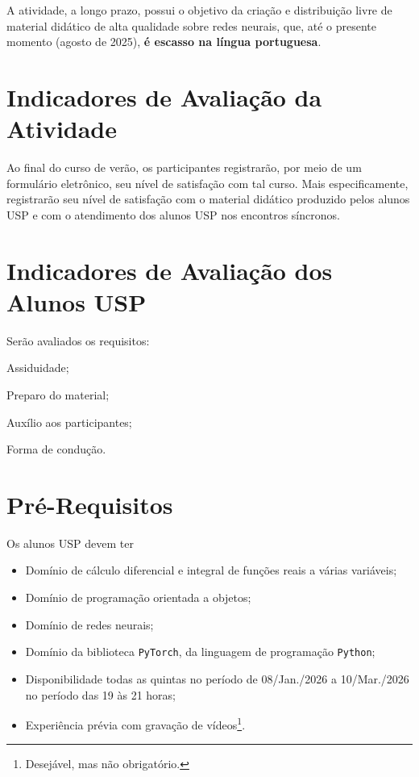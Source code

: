 \documentclass[a4paper,12pt, brazil]{article}
\begin{document}
    A atividade, a longo prazo, possui o objetivo da criação e distribuição livre de material didático de alta qualidade sobre redes neurais, que, até o presente momento (agosto de 2025), \textbf{é escasso na língua portuguesa}.

    \section*{Indicadores de Avaliação da Atividade}
    Ao final do curso de verão, os participantes registrarão, por meio de um formulário eletrônico, seu nível de satisfação com tal curso. Mais especificamente, registrarão seu nível de satisfação com o material didático produzido pelos alunos USP e com o atendimento dos alunos USP nos encontros síncronos.

    \section*{Indicadores de Avaliação dos Alunos USP}
    Serão avaliados os requisitos:
    \begin{itemize}
\begin{multicols}{2}
        \item Assiduidade;
        \item Preparo do material;
        \item Auxílio aos participantes;
        \item Forma de condução.
\end{multicols}
    \end{itemize}

    \section*{Pré-Requisitos}
    Os alunos USP devem ter
    \begin{itemize}
        \item  Domínio de cálculo diferencial e integral de funções reais a várias variáveis;
        \item Domínio de programação orientada a objetos;
        \item Domínio de redes neurais;
        \item Domínio da biblioteca \verb|PyTorch|, da linguagem de programação \verb|Python|;
        \item Disponibilidade todas as quintas no período de 08/Jan./2026 a 10/Mar./2026 no período das 19 às 21 horas;
        \item Experiência prévia com gravação de vídeos\footnote{Desejável, mas não obrigatório.}.
    \end{itemize}
\end{document}
